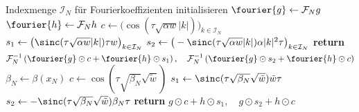 \begin{algorithm}[ht]
\begin{algorithmic}[1]
        	\State Indexmenge $\mathcal{I}_N$ für Fourierkoeffizienten initialisieren
        	\State $\fourier{g}\gets \mathcal{F}_Ng$
        	\State $\fourier{h}\gets \mathcal{F}_Nh$
        	\State $c\gets \big(\cos(\tau\sqrt{\alpha w}|k|)\big)_{k\in\mathcal{I}_N}$
        	\State $s_1\gets \big(\sinc(\tau\sqrt{\alpha w}|k|)\tau w\big)_{k\in\mathcal{I}_N}$
        	\State $s_2\gets \big(-\sinc(\tau\sqrt{\alpha w}|k|)\alpha|k|^2\tau\big)_{k\in\mathcal{I}_N}$
            \State \textbf{return} $\mathcal{F}_N^{-1}\left(\fourier{g}\odot c+\fourier{h}\odot s_1\right),\quad \mathcal{F}_N^{-1}\left(\fourier{g}\odot s_2+\fourier{h}\odot c\right)$
        \EndFunction
        	\State $\beta_N\gets\beta(x_N)$
        	\State $c\gets \cos(\tau\sqrt{\beta_N}\sqrt{\tilde{w}})$
        	\State $s_1\gets \sinc(\tau\sqrt{\beta_N}\sqrt{\tilde{w}})\tilde{w}\tau$
        	\State $s_2\gets -\sinc(\tau\sqrt{\beta_N}\sqrt{\tilde{w}})\beta_N\tau$
        	\State \textbf{return} $g\odot c+h\odot s_1,\quad g\odot s_2+h\odot c$
        \EndFunction
    \end{algorithmic}
\end{algorithm}


